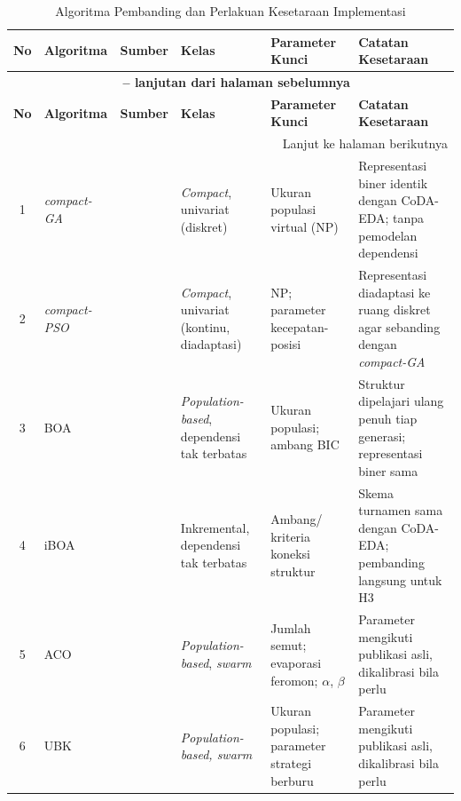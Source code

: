 \begin{longtable}{|c|>{\raggedright\arraybackslash}p{1.7cm}|>{\raggedright\arraybackslash}p{2.2cm}|>{\raggedright\arraybackslash}p{2cm}|>{\raggedright\arraybackslash}p{2cm}|>{\raggedright\arraybackslash}p{3.2cm}|}
\caption{Algoritma Pembanding dan Perlakuan Kesetaraan Implementasi}
\label{tab:algoritma-pembanding} \\
\hline
\textbf{No} & \textbf{Algoritma} & \textbf{Sumber} & \textbf{Kelas} & \textbf{Parameter Kunci} & \textbf{Catatan Kesetaraan} \\
\hline
\endfirsthead

\multicolumn{6}{c}{{\bfseries \tablename\ \thetable{} -- lanjutan dari halaman sebelumnya}} \\
\hline
\textbf{No} & \textbf{Algoritma} & \textbf{Sumber} & \textbf{Kelas} & \textbf{Parameter Kunci} & \textbf{Catatan Kesetaraan} \\
\hline
\endhead

\hline
\multicolumn{6}{r}{Lanjut ke halaman berikutnya} \\
\endfoot

\hline
\endlastfoot

1 & \textit{compact-GA} & \parencite{khalfi_metaheuristics_2023} & \textit{Compact}, univariat (diskret) & Ukuran populasi virtual (NP) & Representasi biner identik dengan CoDA-EDA; tanpa pemodelan dependensi \\
\hline
2 & \textit{compact-PSO} & \parencite{khalfi_metaheuristics_2023} & \textit{Compact}, univariat (kontinu, diadaptasi) & NP; parameter kecepatan-posisi & Representasi diadaptasi ke ruang diskret agar sebanding dengan \textit{compact-GA} \\
\hline
3 & BOA & \parencite{pelikan_iboa_2008} & \textit{Population-based}, dependensi tak terbatas & Ukuran populasi; ambang BIC & Struktur dipelajari ulang penuh tiap generasi; representasi biner sama \\
\hline
4 & iBOA & \parencite{pelikan_iboa_2008} & Inkremental, dependensi tak terbatas & Ambang/ kriteria koneksi struktur & Skema turnamen sama dengan CoDA-EDA; pembanding langsung untuk H3 \\
\hline
5 & ACO & \parencite{shang_abac_2024} & \textit{Population-based}, \textit{swarm} & Jumlah semut; evaporasi feromon; $\alpha$\label{first:symbol-alpha}, $\beta$\label{first:symbol-beta} & Parameter mengikuti publikasi asli, dikalibrasi bila perlu \\
\hline
6 & UBK & \parencite{li_attribute_2026} & \textit{Population-based, swarm} & Ukuran populasi; parameter strategi berburu & Parameter mengikuti publikasi asli, dikalibrasi bila perlu \\
\hline

\end{longtable}

